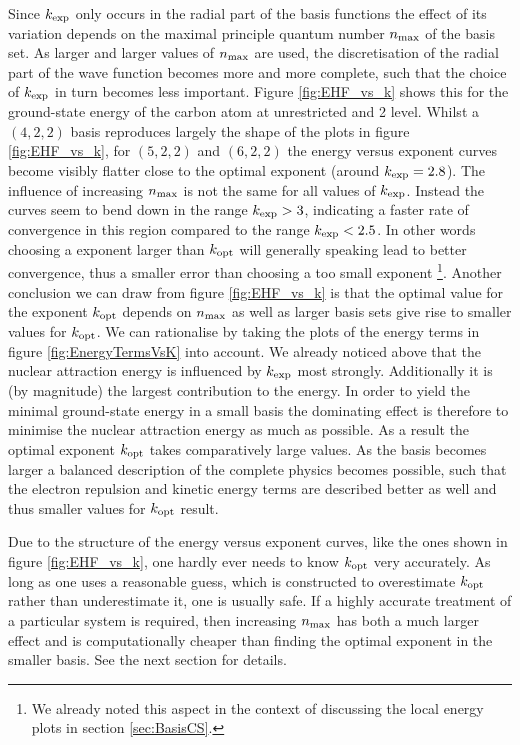 Since $k_\text{exp}$ only occurs in the radial part of the \CS basis functions
the effect of its variation depends on the
maximal principle quantum number $n_\text{max}$ of the basis set.
As larger and larger values of $n_\text{max}$ are used,
the discretisation of the radial part of the wave function
becomes more and more complete,
such that the choice of $k_\text{exp}$ in turn becomes less important.
Figure \vref{fig:EHF_vs_k} shows this for the ground-state energy of the carbon atom
at unrestricted \HF and {\MP}2 level.
Whilst a $(4,2,2)$ \CS basis reproduces largely the
shape of the plots in figure \ref{fig:EHF_vs_k},
for $(5,2,2)$ and $(6,2,2)$ the energy versus exponent curves
become visibly flatter close to the optimal exponent (around $k_\text{exp} = 2.8$).
The influence of increasing $n_\text{max}$ is not the same
for all values of $k_\text{exp}$.
Instead the curves seem to bend down in the range $k_\text{exp} > 3$,
indicating a faster rate of convergence in this region
compared to the range $k_\text{exp} < 2.5$.
In other words choosing a \CS exponent larger than $k_\text{opt}$
will generally speaking lead to better convergence,
thus a smaller error than choosing a too small exponent%
\footnote{We already noted this aspect in the context of discussing
	the local energy plots in section \ref{sec:BasisCS}.}.
Another conclusion we can draw from figure \ref{fig:EHF_vs_k}
is that the optimal value for the exponent $k_\text{opt}$
depends on $n_\text{max}$ as well
as larger basis sets give rise to smaller values for $k_\text{opt}$.
We can rationalise by taking the plots of the energy terms
in figure \vref{fig:EnergyTermsVsK} into account.
We already noticed above that the nuclear attraction energy
is influenced by $k_\text{exp}$ most strongly.
Additionally it is (by magnitude) the largest contribution to the \HF energy.
In order to yield the minimal ground-state energy
in a small basis the dominating effect is therefore to
minimise the nuclear attraction energy as much as possible.
As a result the optimal exponent $k_\text{opt}$ takes comparatively large values.
As the basis becomes larger a balanced description
of the complete physics becomes possible,
such that the electron repulsion and kinetic energy terms
are described better as well
and thus smaller values for $k_\text{opt}$ result.

Due to the structure of the energy versus exponent curves,
like the ones shown in figure \vref{fig:EHF_vs_k},
one hardly ever needs to know $k_\text{opt}$ very accurately.
As long as one uses a reasonable guess,
which is constructed to overestimate $k_\text{opt}$
rather than underestimate it, one is usually safe.
If a highly accurate treatment of a particular system is required,
then increasing $n_\text{max}$ has both a much larger effect
and is computationally cheaper than finding the optimal exponent in the smaller basis.
See the next section for details.

